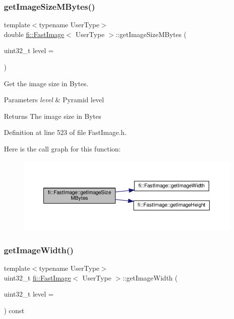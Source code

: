 \subsubsection{\texorpdfstring{get\+Image\+Size\+M\+Bytes()}{getImageSizeMBytes()}}
{\footnotesize\ttfamily template$<$typename User\+Type$>$ \\
double \hyperlink{classfi_1_1FastImage}{fi\+::\+Fast\+Image}$<$ User\+Type $>$\+::get\+Image\+Size\+M\+Bytes (\begin{DoxyParamCaption}\item[{uint32\+\_\+t}]{level = {} }\end{DoxyParamCaption})\hspace{0.3cm}{\ttfamily [inline]}}



Get the image size in Bytes. 


\begin{DoxyParams}{Parameters}
{\em level} & Pyramid level \\
\hline
\end{DoxyParams}
\begin{DoxyReturn}{Returns}
The image size in Bytes 
\end{DoxyReturn}


Definition at line 523 of file Fast\+Image.\+h.

Here is the call graph for this function\+:
\nopagebreak
\begin{figure}[H]
\begin{center}
\leavevmode
\includegraphics[width=350pt]{dc/d6b/classfi_1_1FastImage_a9a2d39cfad1bbc8a1b5d573a5249cb68_cgraph}
\end{center}
\end{figure}
\mbox{\label{classfi_1_1FastImage_a1ea580c3c08fe5be5575f0007b1bafbe}} 
\subsubsection{\texorpdfstring{get\+Image\+Width()}{getImageWidth()}}
{\footnotesize\ttfamily template$<$typename User\+Type$>$ \\
uint32\+\_\+t \hyperlink{classfi_1_1FastImage}{fi\+::\+Fast\+Image}$<$ User\+Type $>$\+::get\+Image\+Width (\begin{DoxyParamCaption}\item[{uint32\+\_\+t}]{level = {} }\end{DoxyParamCaption}) const\hspace{0.3cm}{\ttfamily [inline]}}



